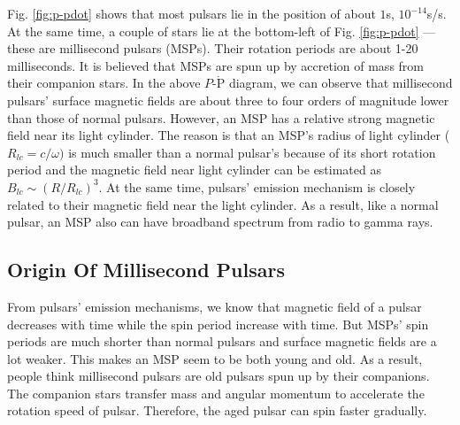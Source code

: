 \documentclass[12pt]{report}
\begin{document}
          Fig. \ref{fig:p-pdot} shows that most pulsars lie in the position of about 
          $1$s, $10^{-14}$s/s. At the same time, a couple of stars lie at the bottom-left 
          of Fig. \ref{fig:p-pdot} --- these are millisecond pulsars (MSPs). Their 
          rotation periods are about 1-20 milliseconds. It is believed that MSPs are spun 
          up by accretion of mass from their companion stars. In the above 
          $P$-$\dot{\mbox{P}}$ diagram, we can observe that millisecond pulsars' 
          surface magnetic fields are about three to four orders of magnitude lower than those
          of normal pulsars. However, an MSP has a relative strong magnetic field near its 
          light cylinder. The reason is that an MSP's radius 
          of light cylinder ($R_{lc}=c/\omega)$ is much smaller than a normal pulsar's 
          because of its short rotation period and the magnetic field near light cylinder can
          be estimated as $B_{lc}\sim\left(R/R_{lc}\right)^3$. At the same time, 
          pulsars' emission mechanism is closely related to their magnetic field near the light 
          cylinder. As a result, like a normal pulsar, an MSP also can have broadband spectrum 
          from radio to gamma rays. 
          \subsection{Origin Of Millisecond Pulsars}
            From pulsars' emission mechanisms, we know that magnetic field of a pulsar 
            decreases with time while the spin period increase with time. But MSPs' spin 
            periods are much shorter than normal pulsars and surface magnetic fields are a 
            lot weaker. This makes an MSP seem to be both young and old. As a result,
            people think millisecond pulsars are old pulsars spun up by their companions. 
            The companion stars transfer mass and angular momentum to accelerate the rotation
            speed of pulsar. Therefore, the aged pulsar can spin faster gradually. 
\end{document}

